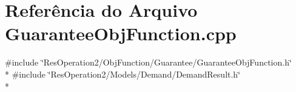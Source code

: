 \section{Referência do Arquivo Guarantee\+Obj\+Function.\+cpp}
\label{_2_obj_function_2_guarantee_2_guarantee_obj_function_8cpp}
{\ttfamily \#include \char`\"{}Res\+Operation2/\+Obj\+Function/\+Guarantee/\+Guarantee\+Obj\+Function.\+h\char`\"{}}\\*
{\ttfamily \#include \char`\"{}Res\+Operation2/\+Models/\+Demand/\+Demand\+Result.\+h\char`\"{}}\\*
